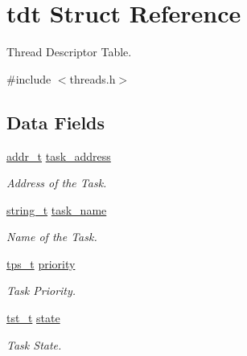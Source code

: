 \hypertarget{a00076}{}\section{tdt Struct Reference}
\label{a00076}


Thread Descriptor Table.  




{\ttfamily \#include $<$threads.\+h$>$}

\subsection*{Data Fields}
\begin{DoxyCompactItemize}
\item 
\hyperlink{a00047_a295f71165288684c38c6bb836fbb3c59_a295f71165288684c38c6bb836fbb3c59}{addr\+\_\+t} \hyperlink{a00076_ad81f2cd346c1134e82393226d2f1852b_ad81f2cd346c1134e82393226d2f1852b}{task\+\_\+address}
\begin{DoxyCompactList}\small\item\em Address of the Task. \end{DoxyCompactList}\item 
\hyperlink{a00032_ab0dcbec9b4b3c60b939b1095f93cb1b9_ab0dcbec9b4b3c60b939b1095f93cb1b9}{string\+\_\+t} \hyperlink{a00076_a46234f76421730447633c8b3d988ec23_a46234f76421730447633c8b3d988ec23}{task\+\_\+name}
\begin{DoxyCompactList}\small\item\em Name of the Task. \end{DoxyCompactList}\item 
\hyperlink{a00044_a5ee504524d7b79ed81a1ed7b325dc9c6_a5ee504524d7b79ed81a1ed7b325dc9c6}{tps\+\_\+t} \hyperlink{a00076_a1f6b2208cd30a76a918127077652ef40_a1f6b2208cd30a76a918127077652ef40}{priority}
\begin{DoxyCompactList}\small\item\em Task Priority. \end{DoxyCompactList}\item 
\hyperlink{a00044_a3895f03bb811310833570ff0b8a403d9_a3895f03bb811310833570ff0b8a403d9}{tst\+\_\+t} \hyperlink{a00076_ac2427b4d11139de3da5e735a9c1c5299_ac2427b4d11139de3da5e735a9c1c5299}{state}
\begin{DoxyCompactList}\small\item\em Task State. \end{DoxyCompactList}\end{DoxyCompactItemize}


